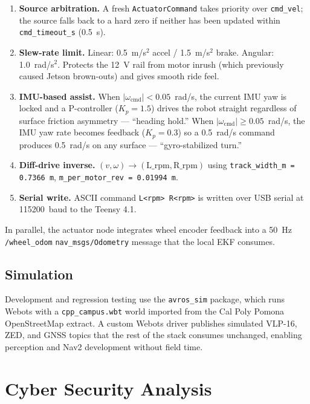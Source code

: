 \documentclass[11pt, letterpaper]{article}
\begin{document}
\begin{enumerate}
    \item \textbf{Source arbitration.} A fresh \texttt{ActuatorCommand} takes priority over \texttt{cmd\_vel}; the source falls back to a hard zero if neither has been updated within \texttt{cmd\_timeout\_s} (0.5~s).
    \item \textbf{Slew-rate limit.} Linear: 0.5~m/s$^2$ accel / 1.5~m/s$^2$ brake. Angular: 1.0~rad/s$^2$. Protects the 12~V rail from motor inrush (which previously caused Jetson brown-outs) and gives smooth ride feel.
    \item \textbf{IMU-based assist.} When $|\omega_{\text{cmd}}| < 0.05$~rad/s, the current IMU yaw is locked and a P-controller ($K_p = 1.5$) drives the robot straight regardless of surface friction asymmetry --- ``heading hold.'' When $|\omega_{\text{cmd}}| \geq 0.05$~rad/s, the IMU yaw rate becomes feedback ($K_p = 0.3$) so a 0.5~rad/s command produces 0.5~rad/s on any surface --- ``gyro-stabilized turn.''
    \item \textbf{Diff-drive inverse.} $(v, \omega) \to (\text{L\_rpm}, \text{R\_rpm})$ using \texttt{track\_width\_m = 0.7366~m}, \texttt{m\_per\_motor\_rev = 0.01994~m}.
    \item \textbf{Serial write.} ASCII command \texttt{L<rpm> R<rpm>} is written over USB serial at 115200~baud to the Teensy 4.1.
\end{enumerate}

In parallel, the actuator node integrates wheel encoder feedback into a 50~Hz
\texttt{/wheel\_odom} \texttt{nav\_msgs/Odometry} message that the local EKF consumes.

\subsection{Simulation}

Development and regression testing use the \texttt{avros\_sim} package, which runs Webots
with a \texttt{cpp\_campus.wbt} world imported from the Cal Poly Pomona OpenStreetMap
extract. A custom Webots driver publishes simulated VLP-16, ZED, and GNSS topics that the
rest of the stack consumes unchanged, enabling perception and Nav2 development without
field time.

\section{Cyber Security Analysis}
\end{document}
